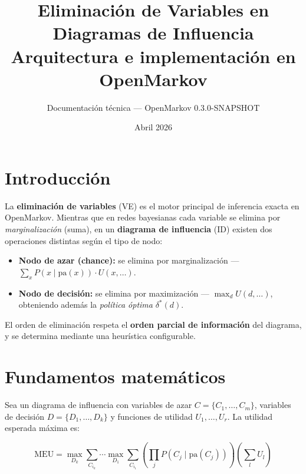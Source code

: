 \documentclass[11pt,a4paper]{article}
\title{%
  Eliminaci\'{o}n de Variables en Diagramas de Influencia\\[4pt]
  \large Arquitectura e implementaci\'{o}n en OpenMarkov}
\author{Documentaci\'{o}n t\'{e}cnica --- OpenMarkov 0.3.0-SNAPSHOT}
\date{Abril 2026}
\begin{document}
\maketitle
\tableofcontents
\newpage

\section{Introducci\'{o}n}

La \textbf{eliminaci\'{o}n de variables} (VE) es el motor principal de inferencia exacta
en OpenMarkov. Mientras que en redes bayesianas cada variable se elimina por
\emph{marginalizaci\'{o}n} (suma), en un \textbf{diagrama de influencia} (ID) existen
dos operaciones distintas seg\'{u}n el tipo de nodo:

\begin{itemize}
  \item \textbf{Nodo de azar (chance):} se elimina por marginalizaci\'{o}n ---
        $\sum_{x} P(x \mid \mathrm{pa}(x)) \cdot U(x, \ldots)$.
  \item \textbf{Nodo de decisi\'{o}n:} se elimina por maximizaci\'{o}n ---
        $\max_{d} U(d, \ldots)$, obteniendo adem\'{a}s la \emph{pol\'{i}tica \'{o}ptima}
        $\delta^*(d)$.
\end{itemize}

El orden de eliminaci\'{o}n respeta el \textbf{orden parcial de informaci\'{o}n}
del diagrama, y se determina mediante una heur\'{i}stica configurable.

\section{Fundamentos matem\'{a}ticos}

Sea un diagrama de influencia con variables de azar $C = \{C_1, \ldots, C_m\}$,
variables de decisi\'{o}n $D = \{D_1, \ldots, D_k\}$ y funciones de utilidad
$U_1, \ldots, U_r$. La utilidad esperada m\'{a}xima es:

\begin{equation}
  \mathrm{MEU} = \max_{D_k} \sum_{C_{i_k}} \cdots \max_{D_1} \sum_{C_{i_1}}
  \left( \prod_{j} P(C_j \mid \mathrm{pa}(C_j)) \right)
  \left( \sum_{l} U_l \right)
  \label{eq:meu}
\end{equation}
\end{document}
